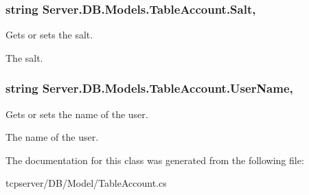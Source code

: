 \subsubsection[{Salt}]{\setlength{\rightskip}{0pt plus 5cm}string Server.\+D\+B.\+Models.\+Table\+Account.\+Salt\hspace{0.3cm}{\ttfamily [get]}, {\ttfamily [set]}}\label{classServer_1_1DB_1_1Models_1_1TableAccount_a5d4782aec9c4515ec3158831df9048af}


Gets or sets the salt. 

The salt.\hypertarget{classServer_1_1DB_1_1Models_1_1TableAccount_ad35a3a996444afd590e747e4e4064100}{}
\subsubsection[{User\+Name}]{\setlength{\rightskip}{0pt plus 5cm}string Server.\+D\+B.\+Models.\+Table\+Account.\+User\+Name\hspace{0.3cm}{\ttfamily [get]}, {\ttfamily [set]}}\label{classServer_1_1DB_1_1Models_1_1TableAccount_ad35a3a996444afd590e747e4e4064100}


Gets or sets the name of the user. 

The name of the user.

The documentation for this class was generated from the following file\+:\begin{DoxyCompactItemize}
\item 
tcpserver/\+D\+B/\+Model/Table\+Account.\+cs\end{DoxyCompactItemize}
